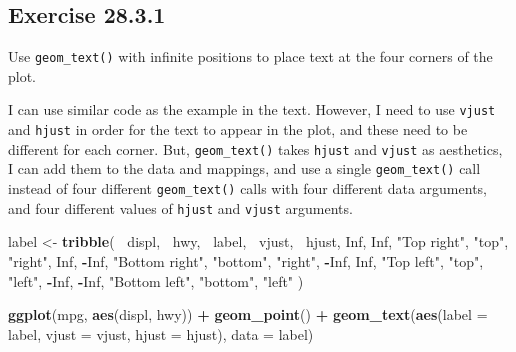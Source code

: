 \documentclass[]{book}
\newenvironment{Shaded}{\begin{snugshade}}{\end{snugshade}}
\newcommand{\DataTypeTok}[1]{\textcolor[rgb]{0.13,0.29,0.53}{#1}}
\newcommand{\KeywordTok}[1]{\textcolor[rgb]{0.13,0.29,0.53}{\textbf{#1}}}
\newcommand{\NormalTok}[1]{#1}
\newcommand{\OperatorTok}[1]{\textcolor[rgb]{0.81,0.36,0.00}{\textbf{#1}}}
\newcommand{\OtherTok}[1]{\textcolor[rgb]{0.56,0.35,0.01}{#1}}
\newcommand{\StringTok}[1]{\textcolor[rgb]{0.31,0.60,0.02}{#1}}
\theoremstyle{plain}
\theoremstyle{remark}
\begin{document}
\hypertarget{exercise-28.3.1}{%
\subsection*{\texorpdfstring{Exercise
{28.3.1}}{Exercise 28.3.1}}\label{exercise-28.3.1}}

Use \texttt{geom\_text()} with infinite positions to place text at the
four corners of the plot.

I can use similar code as the example in the text. However, I need to
use \texttt{vjust} and \texttt{hjust} in order for the text to appear in
the plot, and these need to be different for each corner. But,
\texttt{geom\_text()} takes \texttt{hjust} and \texttt{vjust} as
aesthetics, I can add them to the data and mappings, and use a single
\texttt{geom\_text()} call instead of four different
\texttt{geom\_text()} calls with four different data arguments, and four
different values of \texttt{hjust} and \texttt{vjust} arguments.

\begin{Shaded}
\begin{Highlighting}[]
\NormalTok{label <-}\StringTok{ }\KeywordTok{tribble}\NormalTok{(}
  \OperatorTok{~}\NormalTok{displ, }\OperatorTok{~}\NormalTok{hwy, }\OperatorTok{~}\NormalTok{label, }\OperatorTok{~}\NormalTok{vjust, }\OperatorTok{~}\NormalTok{hjust,}
     \OtherTok{Inf}\NormalTok{,  }\OtherTok{Inf}\NormalTok{,    }\StringTok{"Top right"}\NormalTok{, }\StringTok{"top"}\NormalTok{, }\StringTok{"right"}\NormalTok{,}
     \OtherTok{Inf}\NormalTok{, }\OperatorTok{-}\OtherTok{Inf}\NormalTok{,    }\StringTok{"Bottom right"}\NormalTok{, }\StringTok{"bottom"}\NormalTok{, }\StringTok{"right"}\NormalTok{,}
    \OperatorTok{-}\OtherTok{Inf}\NormalTok{,  }\OtherTok{Inf}\NormalTok{,    }\StringTok{"Top left"}\NormalTok{, }\StringTok{"top"}\NormalTok{, }\StringTok{"left"}\NormalTok{,}
    \OperatorTok{-}\OtherTok{Inf}\NormalTok{, }\OperatorTok{-}\OtherTok{Inf}\NormalTok{,    }\StringTok{"Bottom left"}\NormalTok{, }\StringTok{"bottom"}\NormalTok{, }\StringTok{"left"}
\NormalTok{)}

\KeywordTok{ggplot}\NormalTok{(mpg, }\KeywordTok{aes}\NormalTok{(displ, hwy)) }\OperatorTok{+}
\StringTok{  }\KeywordTok{geom_point}\NormalTok{() }\OperatorTok{+}
\StringTok{  }\KeywordTok{geom_text}\NormalTok{(}\KeywordTok{aes}\NormalTok{(}\DataTypeTok{label =}\NormalTok{ label, }\DataTypeTok{vjust =}\NormalTok{ vjust, }\DataTypeTok{hjust =}\NormalTok{ hjust), }\DataTypeTok{data =}\NormalTok{ label)}
\end{Highlighting}
\end{Shaded}
\end{document}
